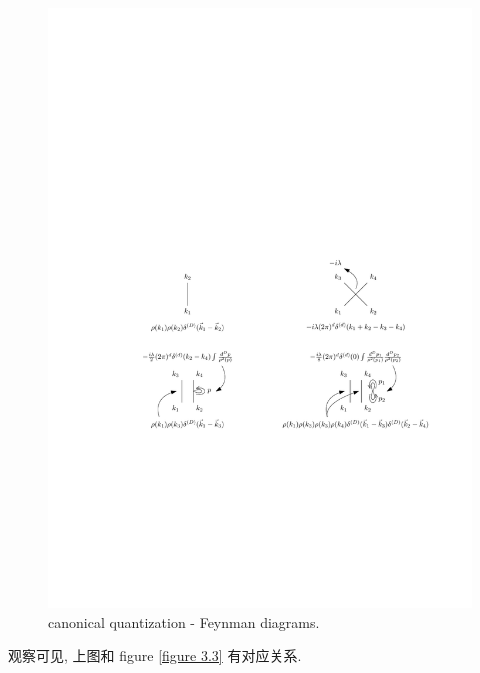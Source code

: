 \begin{itemize}
	\begin{figure}[H]
		\centering
		\includegraphics[scale=1]{figures/canonical quantization - Feynman diagrams.pdf}
		\caption{canonical quantization - Feynman diagrams.}
	\end{figure}
	
	观察可见, 上图和 figure \ref{figure 3.3} 有对应关系.
	

\end{itemize}
